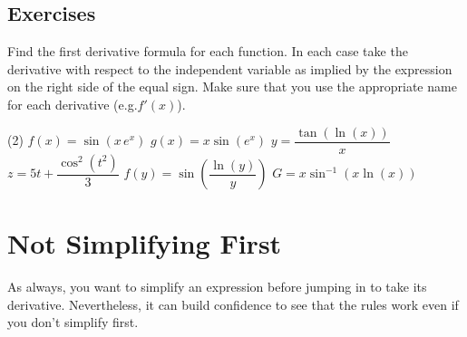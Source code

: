 \documentclass[12pt,]{book}
\theoremstyle{plain}
\theoremstyle{definition}
\numberwithin{equation}{section}
\newcommand{\fe}[2]{#1\mathopen{}\left(#2\right)\mathclose{}}
\newcommand{\fd}[1]{#1'}
\begin{document}
\subsection[Exercises]{Exercises}\label{exercises-44}
\hypertarget{exercisegroup-94}{\null}Find the first derivative formula for each function.  In each case take the derivative with respect to the independent variable as implied by the expression on the right side of the equal sign.  Make sure that you use the appropriate name for each derivative (e.g.\@ \(\fe{\fd{f}}{x}\)).%
\par
\begin{exercisegroup}(2)
\exercise[1.]\hypertarget{exercise-455}{\null}\(\fe{f}{x}=\fe{\sin}{x\,e^x}\)%
\exercise[2.]\hypertarget{exercise-456}{\null}\(\fe{g}{x}=x\fe{\sin}{e^x}\)%
\exercise[3.]\hypertarget{exercise-457}{\null}\(y=\dfrac{\fe{\tan}{\fe{\ln}{x}}}{x}\)%
\exercise[4.]\hypertarget{exercise-458}{\null}\(z=5t+\dfrac{\fe{\cos^2}{t^2}}{3}\)%
\exercise[5.]\hypertarget{exercise-459}{\null}\(\fe{f}{y}=\fe{\sin}{\dfrac{\fe{\ln}{y}}{y}}\)%
\exercise[6.]\hypertarget{exercise-460}{\null}\(G=x\fe{\sin^{-1}}{x\fe{\ln}{x}}\)%
\end{exercisegroup}
\par\smallskip\noindent
\typeout{************************************************}
\typeout{************************************************}
\section[Not Simplifying First]{Not Simplifying First}\label{section-not-simplifying-first}
As always, you want to simplify an expression before jumping in to take its derivative.  Nevertheless, it can build confidence to see that the rules work even if you don't simplify first.%
\typeout{************************************************}
\typeout{************************************************}
\end{document}
